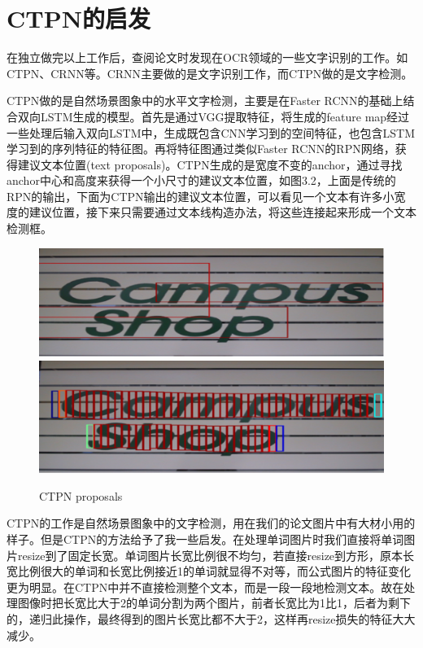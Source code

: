 \section{CTPN的启发}
\noindent

在独立做完以上工作后，查阅论文时发现在OCR领域的一些文字识别的工作。如 CTPN\parencite{ctpn}、CRNN等。CRNN主要做的是文字识别工作，而CTPN做的是文字检测。

CTPN做的是自然场景图象中的水平文字检测，主要是在Faster RCNN的基础上结合双向LSTM生成的模型。首先是通过VGG提取特征，将生成的feature map经过一些处理后输入双向LSTM中，生成既包含CNN学习到的空间特征，也包含LSTM学习到的序列特征的特征图。再将特征图通过类似Faster RCNN的RPN网络，获得建议文本位置(text proposals)。CTPN生成的是宽度不变的anchor，通过寻找anchor中心和高度来获得一个小尺寸的建议文本位置，如图3.2，上面是传统的RPN的输出，下面为CTPN输出的建议文本位置，可以看见一个文本有许多小宽度的建议位置，接下来只需要通过文本线构造办法，将这些连接起来形成一个文本检测框。
\begin{figure}[hp]
    \centering
    \includegraphics[scale=0.5]{eps/rpn.eps}
    \includegraphics[scale=0.5]{eps/ctpn.eps}
    \caption{CTPN proposals}
    \label{fig:label}
\end{figure}
CTPN的工作是自然场景图象中的文字检测，用在我们的论文图片中有大材小用的样子。但是CTPN的方法给予了我一些启发。在处理单词图片时我们直接将单词图片resize到了固定长宽。单词图片长宽比例很不均匀，若直接resize到方形，原本长宽比例很大的单词和长宽比例接近1的单词就显得不对等，而公式图片的特征变化更为明显。在CTPN中并不直接检测整个文本，而是一段一段地检测文本。故在处理图像时把长宽比大于2的单词分割为两个图片，前者长宽比为1比1，后者为剩下的，递归此操作，最终得到的图片长宽比都不大于2，这样再resize损失的特征大大减少。

